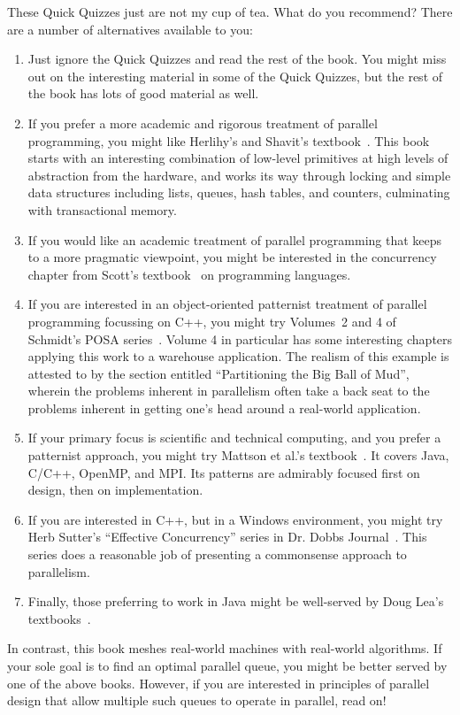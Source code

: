 \QuickQ{}
	These Quick Quizzes just are not my cup of tea.
	What do you recommend?
\QuickA{}
	There are a number of alternatives available to you:
	\begin{enumerate}
	\item	Just ignore the Quick Quizzes and read the rest of
		the book.
		You might miss out on the interesting material in
		some of the Quick Quizzes, but the rest of the book
		has lots of good material as well.
	\item	If you prefer a more academic and rigorous treatment of
		parallel programming,
		you might like Herlihy's and Shavit's
		textbook~\cite{HerlihyShavit2008Textbook}.
		This book starts with an interesting combination
		of low-level primitives at high levels of abstraction
		from the hardware, and works its way through locking
		and simple data structures including lists, queues,
		hash tables, and counters, culminating with transactional
		memory.
	\item	If you would like an academic treatment of parallel
		programming that keeps to a more pragmatic viewpoint,
		you might be interested in the concurrency chapter from Scott's
		textbook~\cite{MichaelScott2006Textbook}
		on programming languages.
	\item	If you are interested in an object-oriented patternist
		treatment of parallel programming focussing on C++,
		you might try Volumes~2 and 4 of Schmidt's POSA
		series~\cite{SchmidtStalRohnertBuschmann2000v2Textbook,
		BuschmannHenneySchmidt2007v4Textbook}.
		Volume 4 in particular has some interesting chapters
		applying this work to a warehouse application.
		The realism of this example is attested to by
		the section entitled ``Partitioning the Big Ball of Mud'',
		wherein the problems inherent in parallelism often
		take a back seat to the problems inherent in getting
		one's head around a real-world application.
	\item	If your primary focus is scientific and technical computing,
		and you prefer a patternist approach,
		you might try Mattson et al.'s
		textbook~\cite{Mattson2005Textbook}.
		It covers Java, C/C++, OpenMP, and MPI.
		Its patterns are admirably focused first on design,
		then on implementation.
	\item	If you are interested in C++, but in a Windows environment,
		you might try Herb Sutter's ``Effective Concurrency''
		series in
		Dr. Dobbs Journal~\cite{HerbSutter2008EffectiveConcurrency}.
		This series does a reasonable job of presenting a
		commonsense approach to parallelism.
	\item	Finally, those preferring to work in Java might be
		well-served by Doug Lea's
		textbooks~\cite{DougLea1997Textbook,Goetz2007Textbook}.
	\end{enumerate}
	In contrast, this book meshes real-world machines with real-world
	algorithms.
	If your sole goal is to find an optimal parallel queue, you might
	be better served by one of the above books.
	However, if you are interested in principles of parallel design
	that allow multiple such queues to operate in parallel, read on!

